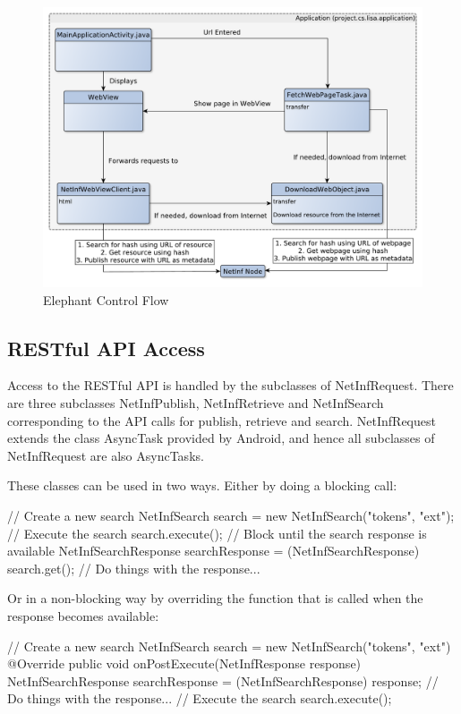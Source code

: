\begin{figure}
\centering
\centerline{\includegraphics[width=1.4\textwidth]{./img/flowchart-application.pdf}}
\caption{Elephant Control Flow}
\label{fig:application-controlflow}
\end{figure}

\subsection{RESTful API Access}

Access to the RESTful API is handled by the subclasses of NetInfRequest. There are three subclasses NetInfPublish, NetInfRetrieve and NetInfSearch corresponding to the API calls for publish, retrieve and search. NetInfRequest extends the class AsyncTask provided by Android, and hence all subclasses of NetInfRequest are also AsyncTasks.

These classes can be used in two ways. Either by doing a blocking call:

\begin{code}[language=Java]
	// Create a new search
	NetInfSearch search = new NetInfSearch("tokens", "ext");
	// Execute the search
	search.execute();
	// Block until the search response is available
	NetInfSearchResponse searchResponse =
	        (NetInfSearchResponse) search.get();
	// Do things with the response...
\end{code}

Or in a non-blocking way by overriding the function that is called when the response becomes available:

\begin{code}[language=Java]
	// Create a new search
	NetInfSearch search = new NetInfSearch("tokens", "ext") {
            @Override
            public void onPostExecute(NetInfResponse response) {
                NetInfSearchResponse searchResponse =
                        (NetInfSearchResponse) response;
				// Do things with the response...
            }
    }
    // Execute the search
	search.execute();
\end{code}
